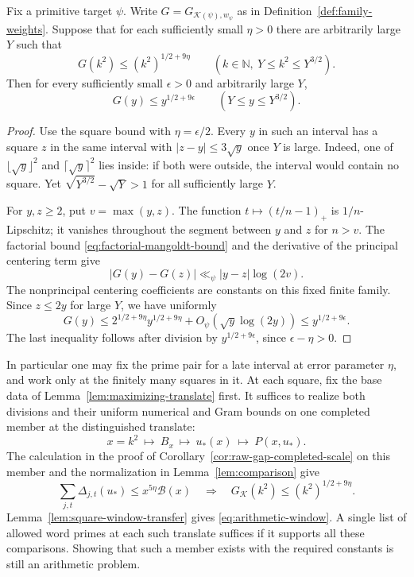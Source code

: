 \begin{auxlemma}\label{lem:square-window-transfer}
Fix a primitive target \(\psi\). Write \(G=G_{\mathcal K(\psi),w_\psi}\)
as in Definition~\ref{def:family-weights}. Suppose that for each
sufficiently small \(\eta>0\) there are arbitrarily large \(Y\) such that
\[
       G(k^2)\le (k^2)^{1/2+9\eta}
       \qquad(k\in\mathbb N,\ Y\le k^2\le Y^{3/2}).
\]
Then for every sufficiently small \(\epsilon>0\) and arbitrarily large \(Y\),
\[
           G(y)\le y^{1/2+9\epsilon}\qquad(Y\le y\le Y^{3/2}).
\]
\end{auxlemma}
\begin{proof}
Use the square bound with \(\eta=\epsilon/2\).
Every \(y\) in such an interval has a square \(z\) in the same interval
with \(|z-y|\le 3\sqrt y\) once \(Y\) is large. Indeed, one of
\(\lfloor\sqrt y\rfloor^2\) and \(\lceil\sqrt y\rceil^2\) lies inside:
if both were outside, the interval would contain no square. Yet
\(\sqrt{Y^{3/2}}-\sqrt Y>1\) for all sufficiently large \(Y\).

For \(y,z\ge2\), put \(v=\max(y,z)\). The function
\(t\mapsto(t/n-1)_+\) is \(1/n\)-Lipschitz; it vanishes throughout
the segment between \(y\) and \(z\) for \(n>v\).
The factorial bound \eqref{eq:factorial-mangoldt-bound} and the derivative
of the principal centering term give
\[
 |G(y)-G(z)|\ll_\psi |y-z|\log(2v).
\]
The nonprincipal centering coefficients are constants on this fixed
finite family. Since \(z\le 2y\) for large \(Y\), we have uniformly
\[
 G(y)\le 2^{1/2+9\eta}y^{1/2+9\eta}
              +O_\psi(\sqrt y\log(2y))\le y^{1/2+9\epsilon}.
\]
The last inequality follows after division by \(y^{1/2+9\epsilon}\),
since \(\epsilon-\eta>0\).
\end{proof}

In particular one may fix the prime pair for a late interval at error
parameter \(\eta\), and work only at the finitely many squares in it.
At each square, fix the base data of Lemma~\ref{lem:maximizing-translate}
first. It suffices to realize both divisions and their uniform numerical
and Gram bounds on one completed member at the distinguished translate:
\[
 x=k^2\ \longmapsto\ B_x\ \longmapsto\ u_*(x)
   \ \longmapsto\ P(x,u_*) .
\]
The calculation in the proof of Corollary~\ref{cor:raw-gap-completed-scale}
on this member and the normalization in Lemma~\ref{lem:comparison} give
\[
 \sum_{j,t}\Delta_{j,t}(u_*)\le x^{5\eta}\mathcal B(x)
       \quad\Longrightarrow\quad G_{\mathcal K}(k^2)\le(k^2)^{1/2+9\eta}.
\]
Lemma~\ref{lem:square-window-transfer} gives
\eqref{eq:arithmetic-window}. A single list of allowed word primes at
each such translate suffices if it supports all these comparisons.
Showing that such a member exists with the required constants is still
an arithmetic problem.

